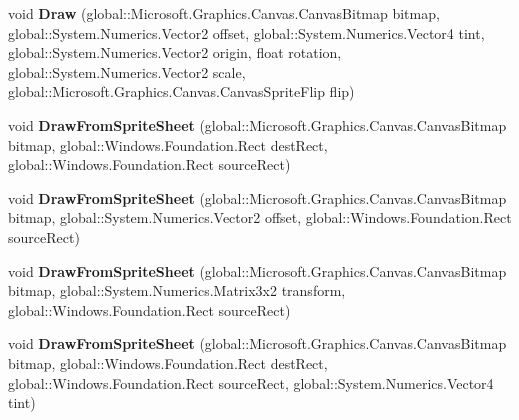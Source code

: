 \begin{DoxyCompactItemize}
\item 
\mbox{\label{interface_microsoft_1_1_graphics_1_1_canvas_1_1_i_canvas_sprite_batch_a6c8abe6402266b85e01ea6236060016d}} 
void {\bfseries Draw} (global\+::\+Microsoft.\+Graphics.\+Canvas.\+Canvas\+Bitmap bitmap, global\+::\+System.\+Numerics.\+Vector2 offset, global\+::\+System.\+Numerics.\+Vector4 tint, global\+::\+System.\+Numerics.\+Vector2 origin, float rotation, global\+::\+System.\+Numerics.\+Vector2 scale, global\+::\+Microsoft.\+Graphics.\+Canvas.\+Canvas\+Sprite\+Flip flip)
\item 
\mbox{\label{interface_microsoft_1_1_graphics_1_1_canvas_1_1_i_canvas_sprite_batch_aa1520881b529a87baf47530abaa95312}} 
void {\bfseries Draw\+From\+Sprite\+Sheet} (global\+::\+Microsoft.\+Graphics.\+Canvas.\+Canvas\+Bitmap bitmap, global\+::\+Windows.\+Foundation.\+Rect dest\+Rect, global\+::\+Windows.\+Foundation.\+Rect source\+Rect)
\item 
\mbox{\label{interface_microsoft_1_1_graphics_1_1_canvas_1_1_i_canvas_sprite_batch_af0f7c640338b4036dade8bebfe7d6efe}} 
void {\bfseries Draw\+From\+Sprite\+Sheet} (global\+::\+Microsoft.\+Graphics.\+Canvas.\+Canvas\+Bitmap bitmap, global\+::\+System.\+Numerics.\+Vector2 offset, global\+::\+Windows.\+Foundation.\+Rect source\+Rect)
\item 
\mbox{\label{interface_microsoft_1_1_graphics_1_1_canvas_1_1_i_canvas_sprite_batch_aed698fc040f38b63a71e4d1e7ea21837}} 
void {\bfseries Draw\+From\+Sprite\+Sheet} (global\+::\+Microsoft.\+Graphics.\+Canvas.\+Canvas\+Bitmap bitmap, global\+::\+System.\+Numerics.\+Matrix3x2 transform, global\+::\+Windows.\+Foundation.\+Rect source\+Rect)
\item 
\mbox{\label{interface_microsoft_1_1_graphics_1_1_canvas_1_1_i_canvas_sprite_batch_a176d58742b3a6407e8ff6d87566b932c}} 
void {\bfseries Draw\+From\+Sprite\+Sheet} (global\+::\+Microsoft.\+Graphics.\+Canvas.\+Canvas\+Bitmap bitmap, global\+::\+Windows.\+Foundation.\+Rect dest\+Rect, global\+::\+Windows.\+Foundation.\+Rect source\+Rect, global\+::\+System.\+Numerics.\+Vector4 tint)

\end{DoxyCompactItemize}
